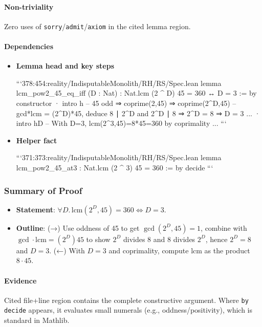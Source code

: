 \documentclass{article}
\begin{document}
\paragraph{Non-triviality}
Zero uses of \texttt{sorry}/\texttt{admit}/\texttt{axiom} in the cited lemma region.

\paragraph{Dependencies}
\begin{itemize}[leftmargin=*]
  \item \textbf{Lemma head and key steps}

```378:454:reality/IndisputableMonolith/RH/RS/Spec.lean
lemma lcm_pow2_45_eq_iff (D : Nat) : Nat.lcm (2 ^ D) 45 = 360 ↔ D = 3 := by
  constructor
  · intro h
    -- 45 odd ⇒ coprime(2,45) ⇒ coprime(2^D,45)
    -- gcd*lcm = (2^D)*45, deduce 8 ∣ 2^D and 2^D ∣ 8 ⇒ 2^D = 8 ⇒ D = 3
    ...
  · intro hD
    -- With D=3, lcm(2^3,45)=8*45=360 by coprimality
    ...
```

  \item \textbf{Helper fact}

```371:373:reality/IndisputableMonolith/RH/RS/Spec.lean
lemma lcm_pow2_45_at3 : Nat.lcm (2 ^ 3) 45 = 360 := by decide
```
\end{itemize}

\subsubsection{Summary of Proof}
\begin{itemize}[leftmargin=*]
  \item \textbf{Statement}: \(\forall D.\,\mathrm{lcm}(2^D,45)=360 \iff D=3\).
  \item \textbf{Outline}: (→) Use oddness of 45 to get \(\gcd(2^D,45)=1\), combine with \(\gcd\cdot\mathrm{lcm}=(2^D)45\) to show \(2^D\) divides 8 and 8 divides \(2^D\), hence \(2^D=8\) and \(D=3\). (←) With \(D=3\) and coprimality, compute lcm as the product \(8\cdot45\).
\end{itemize}

\paragraph{Evidence}
Cited file+line region contains the complete constructive argument. Where \texttt{by decide} appears, it evaluates small numerals (e.g., oddness/positivity), which is standard in Mathlib.
\end{document}
